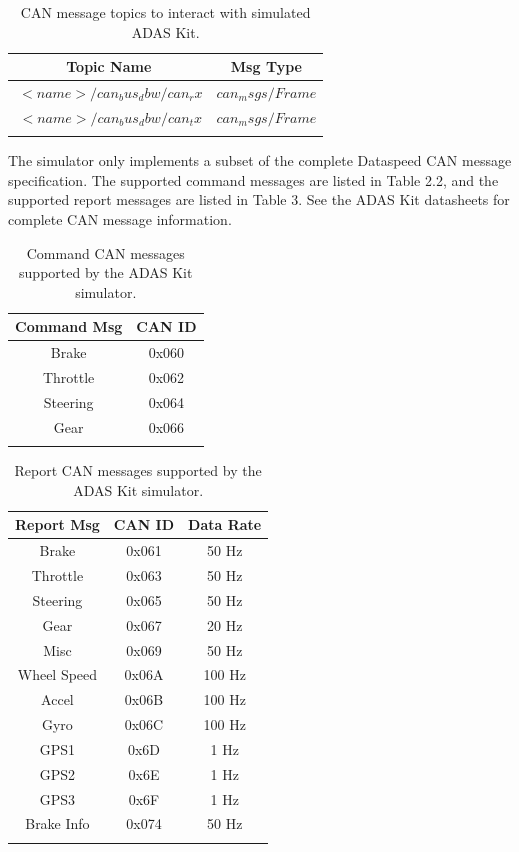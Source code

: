 \begin{table}[h!]
\centering
\begin{tabular}{c c} 
 \hline
 Topic Name & Msg Type \\ [0.5ex] 
 \hline
 $~<name>/can_bus_dbw/can_rx$ & $can_msgs/Frame$  \\ 
 \hline
 $~<name>/can_bus_dbw/can_tx$ & $can_msgs/Frame$ \\ [1ex] 
 \hline \\
\end{tabular}
\caption{CAN message topics to interact with simulated ADAS Kit.}
\label{table:1}
\end{table}

The simulator only implements a subset of the complete Dataspeed CAN message specification. The supported command messages are listed in Table 2.2, and the supported report messages are listed in Table 3. See the ADAS Kit datasheets for complete CAN message information.

\begin{table}[h!]
\centering
\begin{tabular}{c c} 
 \hline
 Command Msg & CAN ID \\ [0.5ex] 
 \hline
 Brake & 0x060 \\ 
 \hline
 Throttle &0x062 \\
  \hline
 Steering & 0x064 \\
 \hline
 Gear & 0x066 \\  [1ex] 
 \hline \\
\end{tabular}
\caption{Command CAN messages supported by the ADAS Kit simulator.}
\label{table:2}
\end{table}

\begin{table}[h!]
\centering
\begin{tabular}{c c c} 
 \hline
Report Msg & CAN ID & Data Rate \\ [0.5ex] 
 \hline
Brake & 0x061 & 50 Hz \\
Throttle & 0x063 &  50 Hz \\
Steering & 0x065 & 50 Hz \\
Gear & 0x067 & 20 Hz \\
Misc & 0x069 & 50 Hz \\
Wheel Speed & 0x06A & 100 Hz \\
Accel & 0x06B & 100 Hz \\
Gyro & 0x06C & 100 Hz \\
GPS1 & 0x6D & 1 Hz \\ 
GPS2 & 0x6E & 1 Hz \\
GPS3 & 0x6F & 1 Hz \\
Brake Info & 0x074 & 50 Hz \\ [1ex]
 \hline \\
\end{tabular}
\caption{Report CAN messages supported by the ADAS Kit simulator.}
\label{table:3}
\end{table}


